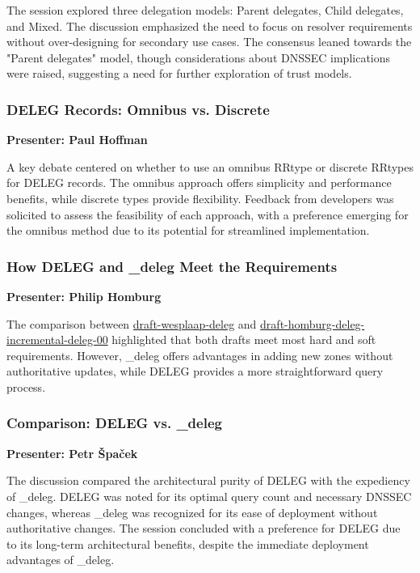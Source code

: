 \documentclass{article}
\begin{document}
The session explored three delegation models: Parent delegates, Child delegates, and Mixed. The discussion emphasized the need to focus on resolver requirements without over-designing for secondary use cases. The consensus leaned towards the "Parent delegates" model, though considerations about DNSSEC implications were raised, suggesting a need for further exploration of trust models.

\subsubsection{DELEG Records: Omnibus vs. Discrete}
\textbf{Presenter: Paul Hoffman}

A key debate centered on whether to use an omnibus RRtype or discrete RRtypes for DELEG records. The omnibus approach offers simplicity and performance benefits, while discrete types provide flexibility. Feedback from developers was solicited to assess the feasibility of each approach, with a preference emerging for the omnibus method due to its potential for streamlined implementation.

\subsubsection{How DELEG and \_deleg Meet the Requirements}
\textbf{Presenter: Philip Homburg}

The comparison between \href{https://datatracker.ietf.org/doc/html/draft-wesplaap-deleg}{draft-wesplaap-deleg} and \href{https://datatracker.ietf.org/doc/html/draft-homburg-deleg-incremental-deleg-00}{draft-homburg-deleg-incremental-deleg-00} highlighted that both drafts meet most hard and soft requirements. However, \_deleg offers advantages in adding new zones without authoritative updates, while DELEG provides a more straightforward query process.

\subsubsection{Comparison: DELEG vs. \_deleg}
\textbf{Presenter: Petr Špaček}

The discussion compared the architectural purity of DELEG with the expediency of \_deleg. DELEG was noted for its optimal query count and necessary DNSSEC changes, whereas \_deleg was recognized for its ease of deployment without authoritative changes. The session concluded with a preference for DELEG due to its long-term architectural benefits, despite the immediate deployment advantages of \_deleg.
\end{document}
